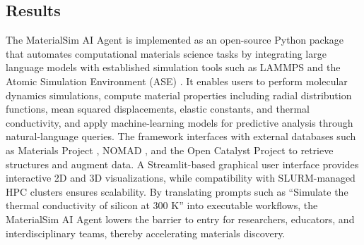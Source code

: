 \subsection*{Results}
The MaterialSim AI Agent is implemented as an open-source Python package that automates computational materials science tasks by integrating large language models with established simulation tools such as LAMMPS \cite{plimpton1995fast} and the Atomic Simulation Environment (ASE) \cite{larsen2017atomic}. It enables users to perform molecular dynamics simulations, compute material properties including radial distribution functions, mean squared displacements, elastic constants, and thermal conductivity, and apply machine-learning models for predictive analysis through natural-language queries. The framework interfaces with external databases such as Materials Project \cite{jain2013commentary}, NOMAD \cite{draxl2019nomad}, and the Open Catalyst Project \cite{chanussot2021open} to retrieve structures and augment data. A Streamlit-based graphical user interface provides interactive 2D and 3D visualizations, while compatibility with SLURM-managed HPC clusters ensures scalability. By translating prompts such as ``Simulate the thermal conductivity of silicon at 300 K'' into executable workflows, the MaterialSim AI Agent lowers the barrier to entry for researchers, educators, and interdisciplinary teams, thereby accelerating materials discovery.


